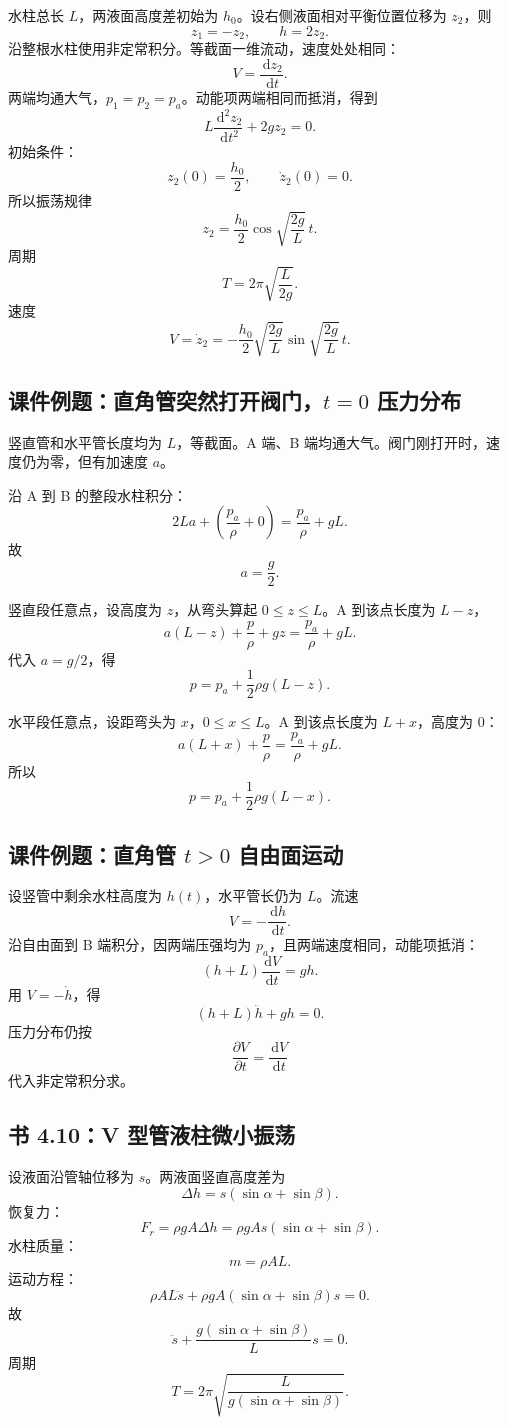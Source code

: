 \documentclass[UTF8,zihao=-4]{ctexart}
\newcommand{\dd}{\,\mathrm d}
\begin{document}
水柱总长 \(L\)，两液面高度差初始为 \(h_0\)。设右侧液面相对平衡位置位移为 \(z_2\)，则
\[
z_1=-z_2,\qquad h=2z_2.
\]
沿整根水柱使用非定常积分。等截面一维流动，速度处处相同：
\[
V=\frac{\dd z_2}{\dd t}.
\]
两端均通大气，\(p_1=p_2=p_a\)。动能项两端相同而抵消，得到
\[
L\frac{\dd^2z_2}{\dd t^2}+2gz_2=0.
\]
初始条件：
\[
z_2(0)=\frac{h_0}{2},\qquad \dot z_2(0)=0.
\]
所以振荡规律
\[
\boxed{
z_2=\frac{h_0}{2}\cos\sqrt{\frac{2g}{L}}\,t.}
\]
周期
\[
\boxed{
T=2\pi\sqrt{\frac{L}{2g}}.}
\]
速度
\[
\boxed{
V=\dot z_2
=-\frac{h_0}{2}\sqrt{\frac{2g}{L}}
\sin\sqrt{\frac{2g}{L}}\,t.}
\]

\subsection*{课件例题：直角管突然打开阀门，\(t=0\) 压力分布}

竖直管和水平管长度均为 \(L\)，等截面。A 端、B 端均通大气。阀门刚打开时，速度仍为零，但有加速度 \(a\)。

沿 A 到 B 的整段水柱积分：
\[
2La+\left(\frac{p_a}{\rho}+0\right)
=\frac{p_a}{\rho}+gL.
\]
故
\[
\boxed{a=\frac g2.}
\]

竖直段任意点，设高度为 \(z\)，从弯头算起 \(0\le z\le L\)。A 到该点长度为 \(L-z\)，
\[
a(L-z)+\frac p\rho+gz
=\frac{p_a}{\rho}+gL.
\]
代入 \(a=g/2\)，得
\[
\boxed{
p=p_a+\frac12\rho g(L-z).}
\]

水平段任意点，设距弯头为 \(x\)，\(0\le x\le L\)。A 到该点长度为 \(L+x\)，高度为 0：
\[
a(L+x)+\frac p\rho
=\frac{p_a}{\rho}+gL.
\]
所以
\[
\boxed{
p=p_a+\frac12\rho g(L-x).}
\]

\subsection*{课件例题：直角管 \(t>0\) 自由面运动}

设竖管中剩余水柱高度为 \(h(t)\)，水平管长仍为 \(L\)。流速
\[
V=-\frac{\dd h}{\dd t}.
\]
沿自由面到 B 端积分，因两端压强均为 \(p_a\)，且两端速度相同，动能项抵消：
\[
(h+L)\frac{\dd V}{\dd t}=gh.
\]
用 \(V=-\dot h\)，得
\[
\boxed{
(h+L)\ddot h+gh=0.}
\]
压力分布仍按
\[
\frac{\partial V}{\partial t}=\frac{\dd V}{\dd t}
\]
代入非定常积分求。

\subsection*{书 4.10：V 型管液柱微小振荡}

设液面沿管轴位移为 \(s\)。两液面竖直高度差为
\[
\Delta h=s(\sin\alpha+\sin\beta).
\]
恢复力：
\[
F_r=\rho gA\Delta h
=\rho gA s(\sin\alpha+\sin\beta).
\]
水柱质量：
\[
m=\rho AL.
\]
运动方程：
\[
\rho AL\ddot s+\rho gA(\sin\alpha+\sin\beta)s=0.
\]
故
\[
\ddot s+\frac{g(\sin\alpha+\sin\beta)}{L}s=0.
\]
周期
\[
\boxed{
T=2\pi\sqrt{\frac{L}{g(\sin\alpha+\sin\beta)}}.}
\]
\end{document}

